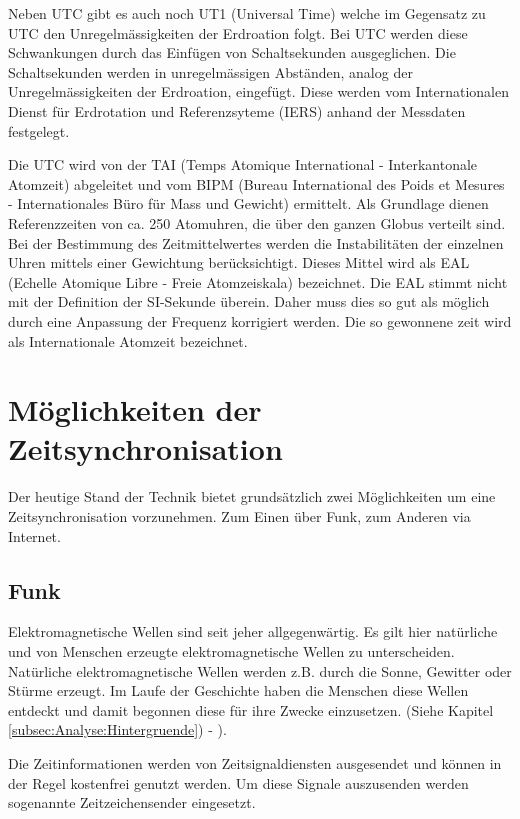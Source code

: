 Neben UTC gibt es auch noch UT1 (Universal Time) welche im Gegensatz zu UTC den Unregelmässigkeiten der Erdroation folgt. Bei UTC werden diese Schwankungen durch das Einfügen von Schaltsekunden ausgeglichen. Die Schaltsekunden werden in unregelmässigen Abständen, analog der Unregelmässigkeiten der Erdroation, eingefügt. Diese werden vom Internationalen Dienst für Erdrotation und Referenzsyteme (IERS)  anhand der Messdaten festgelegt.

Die UTC wird von der TAI (Temps Atomique International - Interkantonale Atomzeit) abgeleitet und vom BIPM (Bureau International des Poids et Mesures - Internationales Büro für Mass und Gewicht) ermittelt. Als Grundlage dienen Referenzzeiten von ca. 250 Atomuhren, die über den ganzen Globus verteilt sind. Bei der Bestimmung des Zeitmittelwertes werden die Instabilitäten der einzelnen Uhren mittels einer Gewichtung berücksichtigt. Dieses Mittel wird als EAL (Echelle Atomique Libre - Freie Atomzeiskala) bezeichnet. Die EAL stimmt nicht mit der Definition der SI-Sekunde überein. Daher muss dies so gut als möglich durch eine Anpassung der Frequenz korrigiert werden. Die so gewonnene zeit wird als Internationale Atomzeit bezeichnet. 


\section{Möglichkeiten der Zeitsynchronisation}
Der heutige Stand der Technik bietet grundsätzlich zwei Möglichkeiten um eine Zeitsynchronisation vorzunehmen. Zum Einen über Funk, zum Anderen via Internet.

\subsection{Funk}
Elektromagnetische Wellen sind seit jeher allgegenwärtig. Es gilt hier natürliche und von Menschen erzeugte elektromagnetische Wellen zu unterscheiden. Natürliche elektromagnetische Wellen werden z.B. durch die Sonne, Gewitter oder Stürme erzeugt. Im Laufe der Geschichte haben die Menschen diese Wellen entdeckt und damit begonnen diese für ihre Zwecke einzusetzen. (Siehe Kapitel \ref{subsec:Analyse:Hintergruende}) - ).

Die Zeitinformationen werden von Zeitsignaldiensten ausgesendet und können in der Regel kostenfrei genutzt werden. Um diese Signale auszusenden werden sogenannte Zeitzeichensender eingesetzt. 

